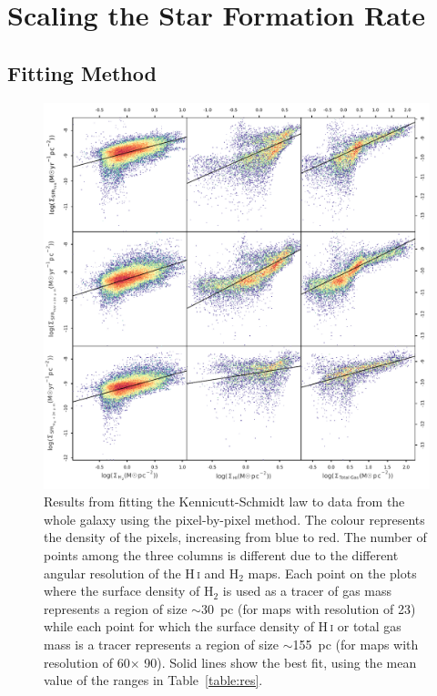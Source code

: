 \section{Scaling the Star Formation Rate}
\subsection{Fitting Method}
\label{sec:fitting}

\begin{figure}
\centering
\includegraphics[width=\textwidth]{../image_paper1/ks_all_density.pdf}
\caption[Results from fitting the Kennicutt-Schmidt law to M31 data from the whole galaxy]{Results from fitting the Kennicutt-Schmidt law to data from the whole galaxy using the pixel-by-pixel method. The colour represents the density of the pixels, increasing from blue to red. The number of points among the three columns is different due to the different angular resolution of the H\,{\textsc i} and H$_2$ maps. Each point on the plots where the surface density of H$_2$ is used as a tracer of gas mass represents a region of size $\sim$30~pc (for maps with resolution of 23\arcsec) while each point for which the surface density of H\,{\textsc i} or total gas mass is a tracer represents a region of size $\sim$155~pc (for maps with resolution of 60\arcsec $\times$ 90\arcsec). Solid lines show the best fit, using the mean value of the ranges in Table~\ref{table:res}.}
\label{fig:ks_all}
\end{figure}

